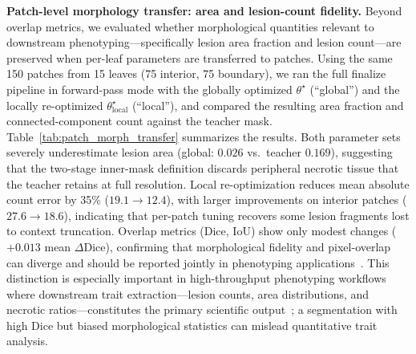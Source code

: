 \documentclass[journal]{IEEEtran}
\begin{document}
\textbf{Patch-level morphology transfer: area and lesion-count fidelity.}
Beyond overlap metrics, we evaluated whether morphological quantities relevant to downstream phenotyping---specifically lesion area fraction and lesion count---are preserved when per-leaf parameters are transferred to patches.
Using the same 150 patches from 15 leaves (75 interior, 75 boundary), we ran the full finalize pipeline in forward-pass mode with the globally optimized $\theta^\star$ (``global'') and the locally re-optimized $\theta_{\mathrm{local}}^\star$ (``local''), and compared the resulting area fraction and connected-component count against the teacher mask.
Table~\ref{tab:patch_morph_transfer} summarizes the results.
Both parameter sets severely underestimate lesion area (global: $0.026$ vs.\ teacher $0.169$), suggesting that the two-stage inner-mask definition discards peripheral necrotic tissue that the teacher retains at full resolution.
Local re-optimization reduces mean absolute count error by 35\% ($19.1 \to 12.4$), with larger improvements on interior patches ($27.6 \to 18.6$), indicating that per-patch tuning recovers some lesion fragments lost to context truncation.
Overlap metrics (Dice, IoU) show only modest changes ($+0.013$ mean $\Delta$Dice), confirming that morphological fidelity and pixel-overlap can diverge and should be reported jointly in phenotyping applications~\cite{ronneberger2015u}.
This distinction is especially important in high-throughput phenotyping workflows where downstream trait extraction---lesion counts, area distributions, and necrotic ratios---constitutes the primary scientific output~\cite{gehan2017high,plantcv2025}; a segmentation with high Dice but biased morphological statistics can mislead quantitative trait analysis.
\end{document}
